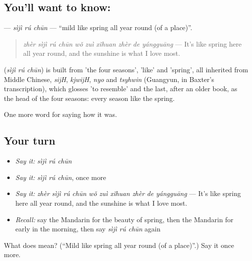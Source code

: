 \subsection*{You'll want to know: }
\textbf{} — \emph{sìjì rú chūn} — \textquotedblleft{}mild like spring all year round (of a place)\textquotedblright{}.

\begin{quote}
\textbf{} \emph{zhèr sìjì rú chūn wǒ zuì xǐhuan zhèr de yángguāng} — It's like spring here all year round, and the sunshine is what I love most.
\end{quote}

\begin{cousinweb}
\textbf{} (\emph{sìjì rú chūn}) is built from  'the four seasons',  'like' and  'spring', all inherited from Middle Chinese, \emph{sijH}, \emph{kjwijH}, \emph{nyo} and \emph{tsyhwin} (Guangyun, in Baxter's transcription), which glosses  'to resemble' and the last, after an older book, as the head of the four seasons: every season like the spring.
\end{cousinweb}

\begin{grammarlens}[title={What you've built}]
One more word for saying how it was.
\end{grammarlens}

\subsection*{Your turn}
\begin{itemize}
\raggedright
  \item \emph{Say it:} \emph{sìjì rú chūn}
  \item \emph{Say it:} \emph{sìjì rú chūn}, once more
  \item \emph{Say it:} \emph{zhèr sìjì rú chūn wǒ zuì xǐhuan zhèr de yángguāng} — It's like spring here all year round, and the sunshine is what I love most.
  \item \emph{Recall:} say the Mandarin for the beauty of spring, then the Mandarin for early in the morning, then say \emph{sìjì rú chūn} again
\end{itemize}

\begin{tcolorbox}[breakable,colback=teal!4,colframe=teal!35!black,title={Before you move on}]
What does  mean? (\textquotedblleft{}Mild like spring all year round (of a place)\textquotedblright{}.) Say it once more.
\end{tcolorbox}

